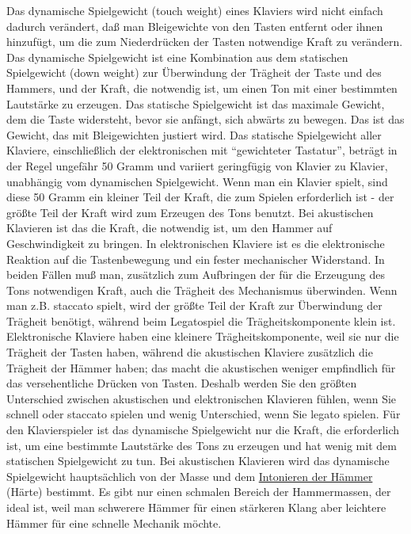 Das dynamische Spielgewicht (touch weight) eines Klaviers wird nicht einfach dadurch verändert, daß man Bleigewichte von den Tasten entfernt oder ihnen hinzufügt, um die zum Niederdrücken der Tasten notwendige Kraft zu verändern.
Das dynamische Spielgewicht ist eine Kombination aus dem statischen Spielgewicht (down weight) zur Überwindung der Trägheit der Taste und des Hammers, und der Kraft, die notwendig ist, um einen Ton mit einer bestimmten Lautstärke zu erzeugen.
Das statische Spielgewicht ist das maximale Gewicht, dem die Taste widersteht, bevor sie anfängt, sich abwärts zu bewegen.
Das ist das Gewicht, das mit Bleigewichten justiert wird.
Das statische Spielgewicht aller Klaviere, einschließlich der elektronischen mit \enquote{gewichteter Tastatur}, beträgt in der Regel ungefähr 50 Gramm und variiert geringfügig von Klavier zu Klavier, unabhängig vom dynamischen Spielgewicht.
Wenn man ein Klavier spielt, sind diese 50 Gramm ein kleiner Teil der Kraft, die zum Spielen erforderlich ist - der größte Teil der Kraft wird zum Erzeugen des Tons benutzt.
Bei akustischen Klavieren ist das die Kraft, die notwendig ist, um den Hammer auf Geschwindigkeit zu bringen.
In elektronischen Klaviere ist es die elektronische Reaktion auf die Tastenbewegung und ein fester mechanischer Widerstand.
In beiden Fällen muß man, zusätzlich zum Aufbringen der für die Erzeugung des Tons notwendigen Kraft, auch die Trägheit des Mechanismus überwinden.
Wenn man z.B. staccato spielt, wird der größte Teil der Kraft zur Überwindung der Trägheit benötigt, während beim Legatospiel die Trägheitskomponente klein ist.
Elektronische Klaviere haben eine kleinere Trägheitskomponente, weil sie nur die Trägheit der Tasten haben, während die akustischen Klaviere zusätzlich die Trägheit der Hämmer haben; das macht die akustischen weniger empfindlich für das versehentliche Drücken von Tasten.
Deshalb werden Sie den größten Unterschied zwischen akustischen und elektronischen Klavieren fühlen, wenn Sie schnell oder staccato spielen und wenig Unterschied, wenn Sie legato spielen.
Für den Klavierspieler ist das dynamische Spielgewicht nur die Kraft, die erforderlich ist, um eine bestimmte Lautstärke des Tons zu erzeugen und hat wenig mit dem statischen Spielgewicht zu tun.
Bei akustischen Klavieren wird das dynamische Spielgewicht hauptsächlich von der Masse und dem \hyperlink{c2_7_hamm}{Intonieren der Hämmer} (Härte) bestimmt.
Es gibt nur einen schmalen Bereich der Hammermassen, der ideal ist, weil man schwerere Hämmer für einen stärkeren Klang aber leichtere Hämmer für eine schnelle Mechanik möchte.
